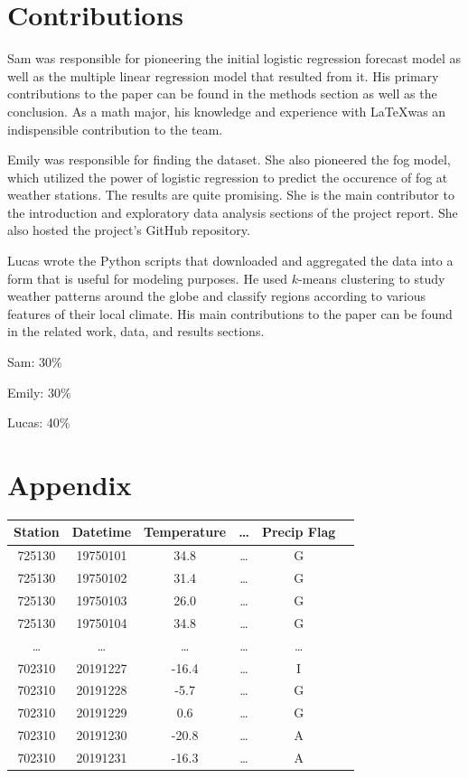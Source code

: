 \documentclass[conference]{IEEEtran}
\begin{document}
\section{Contributions}

Sam was responsible for pioneering the initial logistic regression forecast model as well as the multiple linear regression model that resulted from it. His primary contributions to the paper can be found in the methods section as well as the conclusion. As a math major, his knowledge and experience with \LaTeX was an indispensible contribution to the team.

Emily was responsible for finding the dataset. She also pioneered the fog model, which utilized the power of logistic regression to predict the occurence of fog at weather stations. The results are quite promising. She is the main contributor to the introduction and exploratory data analysis sections of the project report. She also hosted the project's GitHub repository.

Lucas wrote the Python scripts that downloaded and aggregated the data into a form that is useful for modeling purposes. He used $k$-means clustering to study weather patterns around the globe and classify regions according to various features of their local climate. His main contributions to the paper can be found in the related work, data, and results sections.

Sam: 30\%

Emily: 30\%

Lucas: 40\%

\section{Appendix}

\begin{table}[h!]
\centering
 \begin{tabular}{||c c c c c c||}
 \hline
  Station& Datetime &Temperature & \dots & Precip Flag \\ [0.5ex]
 \hline\hline
 725130 & 19750101 & 34.8 & \dots & G \\
 725130 & 19750102 & 31.4 & \dots & G \\
 725130 & 19750103 & 26.0 & \dots & G \\
 725130 & 19750104 & 34.8 & \dots & G \\
 \dots & \dots & \dots & \dots & \dots \\
 702310 & 20191227 & -16.4 & \dots & I \\
 702310 & 20191228 & -5.7 & \dots & G \\
 702310 & 20191229 & 0.6 & \dots & G \\
 702310 & 20191230 & -20.8 & \dots & A \\
 702310 & 20191231 & -16.3 & \dots & A \\[1ex]

 \hline
 \end{tabular}
\end{table}
\end{document}
